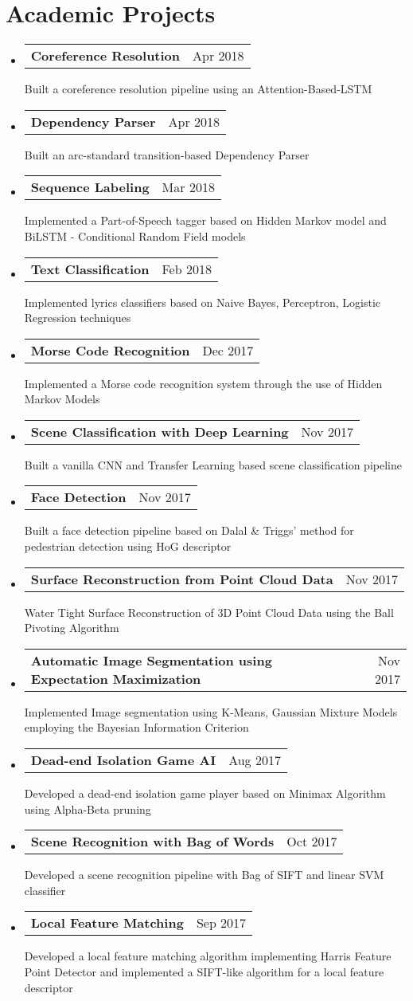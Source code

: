 \documentclass[letterpaper,11pt]{article}
\makeatletter
\newcommand{\resumeSubItem}[3]{
  \vspace{-1pt}\item[]
    \begin{tabular*}{0.97\textwidth}{l@{\extracolsep{\fill}}r}
      \textbf{\small#1} & {\small#2} \\
    \end{tabular*}
    {\small#3} \\
}
\newcommand{\resumeSubHeadingListStart}{\begin{itemize}[label={}, leftmargin=*]}
\newcommand{\resumeSubHeadingListEnd}{\end{itemize}}
\makeatother
\begin{document}
\section{Academic Projects}
  \resumeSubHeadingListStart  	
	\resumeSubItem{Coreference Resolution}{Apr 2018}{Built a coreference resolution pipeline using an Attention-Based-LSTM}
    \resumeSubItem{Dependency Parser}{Apr 2018}{Built an arc-standard transition-based Dependency Parser}
	\resumeSubItem{Sequence Labeling}{Mar 2018}{Implemented a Part-of-Speech tagger based on Hidden Markov model and BiLSTM - Conditional Random Field models}
	\resumeSubItem{Text Classification}{Feb 2018}{Implemented lyrics classifiers based on Naive Bayes, Perceptron, Logistic Regression techniques}
    \resumeSubItem{Morse Code Recognition}{Dec 2017} {Implemented a Morse code recognition system through the use of Hidden Markov Models}
    \resumeSubItem{Scene Classification with Deep Learning}{Nov 2017}{Built a vanilla CNN and Transfer Learning based scene classification pipeline}
    \resumeSubItem{Face Detection}{Nov 2017} {Built a face detection pipeline based on Dalal \& Triggs’ method for pedestrian detection using HoG descriptor}
    \resumeSubItem{Surface Reconstruction from Point Cloud Data}{Nov 2017} {Water Tight Surface Reconstruction of 3D Point Cloud Data using the Ball Pivoting Algorithm}
    \resumeSubItem{Automatic Image Segmentation using Expectation Maximization}{Nov 2017} {Implemented Image segmentation using K-Means, Gaussian Mixture Models employing the Bayesian Information Criterion}
    \resumeSubItem{Dead-end Isolation Game AI}{Aug 2017} {Developed a dead-end isolation game player based on Minimax Algorithm using Alpha-Beta pruning}
    \resumeSubItem{Scene Recognition with Bag of Words}{Oct 2017} {Developed a scene recognition pipeline with Bag of SIFT and linear SVM classifier}
    \resumeSubItem{Local Feature Matching}{Sep 2017} {Developed a local feature matching algorithm implementing Harris Feature Point Detector and implemented a SIFT-like algorithm for a local feature descriptor}
  \resumeSubHeadingListEnd
\end{document}
